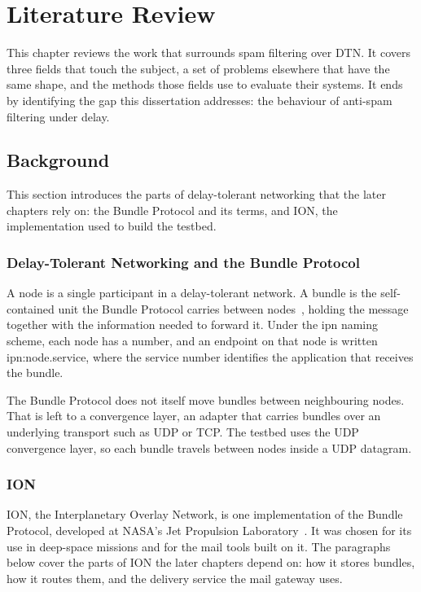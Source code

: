 \chapter{Literature Review}

This chapter reviews the work that surrounds spam filtering over DTN. It covers three fields that touch the subject, a set of problems elsewhere that have the same shape, and the methods those fields use to evaluate their systems. It ends by identifying the gap this dissertation addresses: the behaviour of anti-spam filtering under delay.

\section{Background}
\label{sec:background}

This section introduces the parts of delay-tolerant networking that the later chapters rely on: the Bundle Protocol and its terms, and ION, the implementation used to build the testbed.

\subsection{Delay-Tolerant Networking and the Bundle Protocol}
\label{sec:background-dtn}

A node is a single participant in a delay-tolerant network. A bundle is the self-contained unit the Bundle Protocol carries between nodes~\cite{rfc9171}, holding the message together with the information needed to forward it. Under the ipn naming scheme, each node has a number, and an endpoint on that node is written ipn:node.service, where the service number identifies the application that receives the bundle.

The Bundle Protocol does not itself move bundles between neighbouring nodes. That is left to a convergence layer, an adapter that carries bundles over an underlying transport such as UDP or TCP. The testbed uses the UDP convergence layer, so each bundle travels between nodes inside a UDP datagram.

\subsection{ION}
\label{sec:background-ion}

ION, the Interplanetary Overlay Network, is one implementation of the Bundle Protocol, developed at NASA's Jet Propulsion Laboratory~\cite{ion}. It was chosen for its use in deep-space missions and for the mail tools built on it. The paragraphs below cover the parts of ION the later chapters depend on: how it stores bundles, how it routes them, and the delivery service the mail gateway uses.

